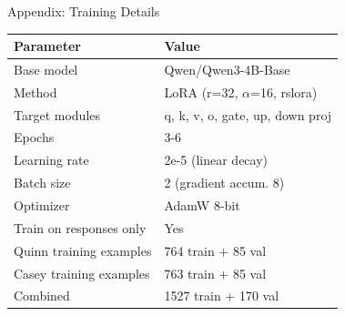 \documentclass[aspectratio=169,11pt]{beamer}
\begin{document}
\begin{frame}{Appendix: Training Details}

	\begin{tabular}{ll}
		\toprule
		Parameter               & Value                            \\
		\midrule
		Base model              & Qwen/Qwen3-4B-Base               \\
		Method                  & LoRA (r=32, $\alpha$=16, rslora) \\
		Target modules          & q, k, v, o, gate, up, down proj  \\
		Epochs                  & 3-6                              \\
		Learning rate           & 2e-5 (linear decay)              \\
		Batch size              & 2 (gradient accum. 8)            \\
		Optimizer               & AdamW 8-bit                      \\
		Train on responses only & Yes                              \\
		\midrule
		Quinn training examples & 764 train + 85 val               \\
		Casey training examples & 763 train + 85 val               \\
		Combined                & 1527 train + 170 val             \\
		\bottomrule
	\end{tabular}

\end{frame}
\end{document}
